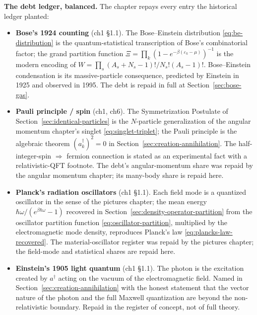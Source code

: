 \medskip\noindent\textbf{The debt ledger, balanced.}
The chapter repays every entry the historical ledger planted:

\begin{itemize}
    \item \textbf{Bose's 1924 counting} (ch1 \S1.1). The Bose--Einstein distribution \eqref{eq:be-distribution} is the quantum-statistical transcription of Bose's combinatorial factor; the grand partition function $\Xi = \prod_k (1 - e^{-\beta(\varepsilon_k-\mu)})^{-1}$ is the modern encoding of $W = \prod_s (A_s + N_s - 1)!/N_s!(A_s - 1)!$. Bose--Einstein condensation is its massive-particle consequence, predicted by Einstein in 1925 and observed in 1995. The debt is repaid in full at Section~\ref{sec:bose-gas}.

    \item \textbf{Pauli principle / spin} (ch1, ch6). The Symmetrization Postulate of Section~\ref{sec:identical-particles} is the $N$-particle generalization of the angular momentum chapter's singlet \eqref{eq:singlet-triplet}; the Pauli principle is the algebraic theorem $(a_k^\dagger)^2 = 0$ in Section~\ref{sec:creation-annihilation}. The half-integer-spin $\Rightarrow$ fermion connection is stated as an experimental fact with a relativistic-QFT footnote. The debt's angular-momentum share was repaid by the angular momentum chapter; its many-body share is repaid here.

    \item \textbf{Planck's radiation oscillators} (ch1 \S1.1). Each field mode is a quantized oscillator in the sense of the pictures chapter; the mean energy $\hbar\omega/(e^{\beta\hbar\omega} - 1)$ recovered in Section~\ref{sec:density-operator-partition} from the oscillator partition function \eqref{eq:oscillator-partition}, multiplied by the electromagnetic mode density, reproduces Planck's law \eqref{eq:plancks-law-recovered}. The material-oscillator register was repaid by the pictures chapter; the field-mode and statistical shares are repaid here.

    \item \textbf{Einstein's 1905 light quantum} (ch1 \S1.1). The photon is the excitation created by $a^\dagger$ acting on the vacuum of the electromagnetic field. Named in Section~\ref{sec:creation-annihilation} with the honest statement that the vector nature of the photon and the full Maxwell quantization are beyond the non-relativistic boundary. Repaid in the register of concept, not of full theory.


\end{itemize}
